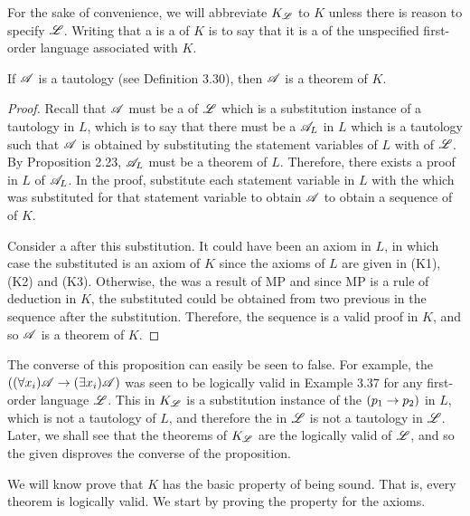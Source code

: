 For the sake of convenience, we will abbreviate \(K_{\mathscr{L}}\) to \(K\) unless there is reason to specify \(\mathscr{L}\). Writing that a \wf{} is a \wf{} of \(K\) is to say that it is a \wf{} of the unspecified first-order language associated with \(K\).

\begin{proposition}
  If \(\mathscr{A}\) is a tautology (see Definition 3.30), then \(\mathscr{A}\) is a theorem of \(K\).

  \begin{proof}
    Recall that \(\mathscr{A}\) must be a \wf{} of \(\mathscr{L}\) which is a substitution instance of a tautology in \(L\), which is to say that there must be a \(\mathscr{A}_L\) in \(L\) which is a tautology such that \(\mathscr{A}\) is obtained by substituting the statement variables of \(L\) with \wfs{} of \(\mathscr{L}{}\). By Proposition 2.23, \(\mathscr{A}_L\) must be a theorem of \(L\). Therefore, there exists a proof in \(L\) of \(\mathscr{A}_L\). In the proof, substitute each statement variable in \(L\) with the \wf{} which was substituted for that statement variable to obtain \(\mathscr{A}\) to obtain a sequence of \wfs{} of \(K\).

    Consider a \wf{} after this substitution. It could have been an axiom in \(L\), in which case the substituted \wf{} is an axiom of \(K\) since the axioms of \(L\) are given in (K1), (K2) and (K3). Otherwise, the \wf{} was a result of MP and since MP is a rule of deduction in \(K\), the substituted \wf{} could be obtained from two previous \wfs{} in the sequence after the substitution. Therefore, the sequence is a valid proof in \(K\), and so \(\mathscr{A}\) is a theorem of \(K\).
  \end{proof}

\end{proposition}

The converse of this proposition can easily be seen to false. For example, the \wf{} \(((\forall x_i) \mathscr{A} \rightarrow (\exists x_i) \mathscr{A})\) was seen to be logically valid in Example 3.37 for any first-order language \(\mathscr{L}\). This \wf{} in \(K_{\mathscr{L}}\) is a substitution instance of the \wf{} \((p_1 \rightarrow p_2)\) in \(L\), which is not a tautology of \(L\), and therefore the \wf{} in \(\mathscr{L}\) is not a tautology in \(\mathscr{L}\). Later, we shall see that the theorems of \(K_{\mathscr{L}}\) are the logically valid \wfs{} of \(\mathscr{L}\), and so the given \wf{} disproves the converse of the proposition.

We will know prove that \(K\) has the basic property of being sound. That is, every theorem is logically valid. We start by proving the property for the axioms.

